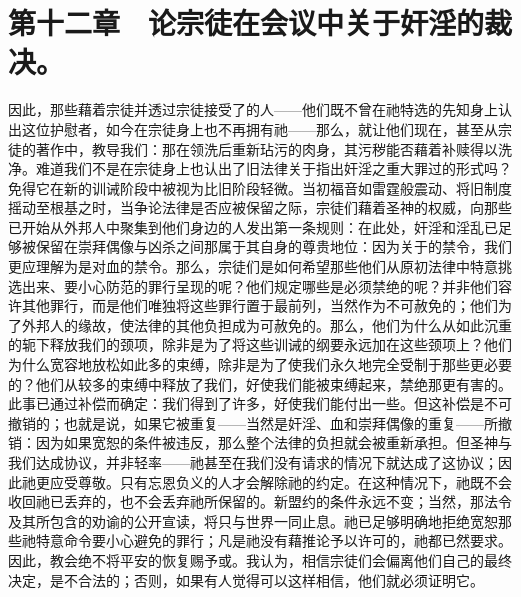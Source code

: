 
\section{第十二章　论宗徒在会议中关于奸淫的裁决。}

因此，那些藉着宗徒并透过宗徒接受了的人——他们既不曾在祂特选的先知身上认出这位护慰者，如今在宗徒身上也不再拥有祂——那么，就让他们现在，甚至从宗徒的著作中，教导我们：那在领洗后重新玷污的肉身，其污秽能否藉着补赎得以洗净。难道我们不是在宗徒身上也认出了旧法律关于指出奸淫之重大罪过的形式吗？免得它在新的训诫阶段中被视为比旧阶段轻微。当初福音如雷霆般震动、将旧制度摇动至根基之时，当争论法律是否应被保留之际，宗徒们藉着圣神的权威，向那些已开始从外邦人中聚集到他们身边的人发出第一条规则：在此处，奸淫和淫乱已足够被保留在崇拜偶像与凶杀之间那属于其自身的尊贵地位：因为关于的禁令，我们更应理解为是对血的禁令。那么，宗徒们是如何希望那些他们从原初法律中特意挑选出来、要小心防范的罪行呈现的呢？他们规定哪些是必须禁绝的呢？并非他们容许其他罪行，而是他们唯独将这些罪行置于最前列，当然作为不可赦免的；他们为了外邦人的缘故，使法律的其他负担成为可赦免的。那么，他们为什么从如此沉重的轭下释放我们的颈项，除非是为了将这些训诫的纲要永远加在这些颈项上？他们为什么宽容地放松如此多的束缚，除非是为了使我们永久地完全受制于那些更必要的？他们从较多的束缚中释放了我们，好使我们能被束缚起来，禁绝那更有害的。此事已通过补偿而确定：我们得到了许多，好使我们能付出一些。但这补偿是不可撤销的；也就是说，如果它被重复——当然是奸淫、血和崇拜偶像的重复——所撤销：因为如果宽恕的条件被违反，那么整个法律的负担就会被重新承担。但圣神与我们达成协议，并非轻率——祂甚至在我们没有请求的情况下就达成了这协议；因此祂更应受尊敬。只有忘恩负义的人才会解除祂的约定。在这种情况下，祂既不会收回祂已丢弃的，也不会丢弃祂所保留的。新盟约的条件永远不变；当然，那法令及其所包含的劝谕的公开宣读，将只与世界一同止息。祂已足够明确地拒绝宽恕那些祂特意命令要小心避免的罪行；凡是祂没有藉推论予以许可的，祂都已然要求。因此，教会绝不将平安的恢复赐予或。我认为，相信宗徒们会偏离他们自己的最终决定，是不合法的；否则，如果有人觉得可以这样相信，他们就必须证明它。\par


